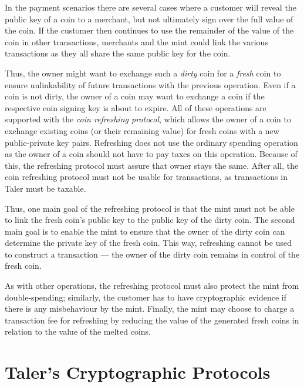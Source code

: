 \documentclass{llncs}
\begin{document}
In the payment scenarios there are several cases where a customer will
reveal the public key of a coin to a merchant, but not ultimately sign
over the full value of the coin.  If the customer then continues to
use the remainder of the value of the coin in other transactions,
merchants and the mint could link the various transactions as they all
share the same public key for the coin.

Thus, the owner might want to exchange such a {\em dirty} coin for a
{\em fresh} coin to ensure unlinkability of future transactions with
the previous operation.  Even if a coin is not dirty, the owner of a
coin may want to exchange a coin if the respective coin signing key is
about to expire.  All of these operations are supported with the {\em
  coin refreshing protocol}, which allows the owner of a coin to
exchange existing coins (or their remaining value) for fresh coins
with a new public-private key pairs.  Refreshing does not use the
ordinary spending operation as the owner of a coin should not have to
pay taxes on this operation.  Because of this, the refreshing protocol
must assure that owner stays the same.  After all, the coin refreshing
protocol must not be usable for transactions, as transactions in Taler
must be taxable.

Thus, one main goal of the refreshing protocol is that the mint must
not be able to link the fresh coin's public key to the public key of
the dirty coin.  The second main goal is to enable the mint to ensure
that the owner of the dirty coin can determine the private key of the
fresh coin.  This way, refreshing cannot be used to construct a
transaction --- the owner of the dirty coin remains in control of the
fresh coin.

As with other operations, the refreshing protocol must also protect
the mint from double-spending; similarly, the customer has to have
cryptographic evidence if there is any misbehaviour by the mint.
Finally, the mint may choose to charge a transaction fee for
refreshing by reducing the value of the generated fresh coins
in relation to the value of the melted coins.


\section{Taler's Cryptographic Protocols}

\end{document}
